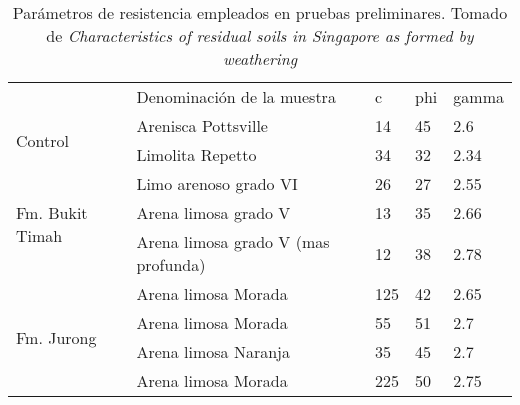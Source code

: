 \begin{table}[H]
\centering
\label{tabla_parametros}
\begin{tabular}{lllll}
                                                  & Denominaci\'on de la muestra          & c   & phi & gamma                     \\ \cline{2-5} 
\multicolumn{1}{l|}{\multirow{2}{*}{Control}}     & Arenisca Pottsville                 & 14  & 45  & \multicolumn{1}{l|}{2.6}  \\
\multicolumn{1}{l|}{}                             & Limolita Repetto                    & 34  & 32  & \multicolumn{1}{l|}{2.34} \\ \hline
\multicolumn{1}{l|}{\multirow{3}{*}{Fm. Bukit Timah}} & Limo arenoso grado VI               & 26  & 27  & \multicolumn{1}{l|}{2.55} \\
\multicolumn{1}{l|}{}                             & Arena limosa grado V                & 13  & 35  & \multicolumn{1}{l|}{2.66} \\
\multicolumn{1}{l|}{}                             & Arena limosa grado V (mas profunda) & 12  & 38  & \multicolumn{1}{l|}{2.78} \\ \hline
\multicolumn{1}{l|}{\multirow{4}{*}{Fm. Jurong}}      & Arena limosa Morada                 & 125 & 42  & \multicolumn{1}{l|}{2.65} \\
\multicolumn{1}{l|}{}                             & Arena limosa Morada                 & 55  & 51  & \multicolumn{1}{l|}{2.7}  \\
\multicolumn{1}{l|}{}                             & Arena limosa Naranja                & 35  & 45  & \multicolumn{1}{l|}{2.7}  \\
\multicolumn{1}{l|}{}                             & Arena limosa Morada                 & 225 & 50  & \multicolumn{1}{l|}{2.75} \\ \cline{2-5} 

\end{tabular}
\caption{Par\'ametros de resistencia empleados en pruebas preliminares. Tomado de \textit{Characteristics of residual soils in Singapore as formed by weathering}  \cite{singapore}}
\label{tab:testtParameter}
\end{table}


